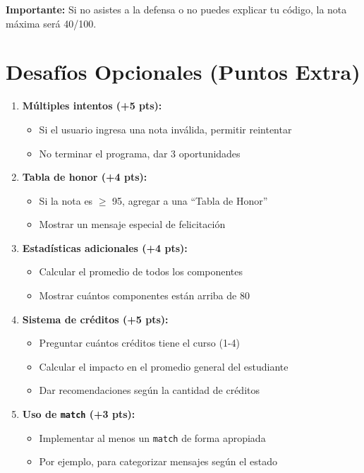 \documentclass[12pt,a4paper]{article}
\begin{document}
\textbf{Importante:} Si no asistes a la defensa o no puedes explicar tu código, la nota máxima será 40/100.

\section{Desafíos Opcionales (Puntos Extra)}

\begin{enumerate}[leftmargin=*]
    \item \textbf{Múltiples intentos (+5 pts):}
    \begin{itemize}
        \item Si el usuario ingresa una nota inválida, permitir reintentar
        \item No terminar el programa, dar 3 oportunidades
    \end{itemize}
    
    \item \textbf{Tabla de honor (+4 pts):}
    \begin{itemize}
        \item Si la nota es $\geq$ 95, agregar a una ``Tabla de Honor''
        \item Mostrar un mensaje especial de felicitación
    \end{itemize}
    
    \item \textbf{Estadísticas adicionales (+4 pts):}
    \begin{itemize}
        \item Calcular el promedio de todos los componentes
        \item Mostrar cuántos componentes están arriba de 80
    \end{itemize}
    
    \item \textbf{Sistema de créditos (+5 pts):}
    \begin{itemize}
        \item Preguntar cuántos créditos tiene el curso (1-4)
        \item Calcular el impacto en el promedio general del estudiante
        \item Dar recomendaciones según la cantidad de créditos
    \end{itemize}
    
    \item \textbf{Uso de \texttt{match} (+3 pts):}
    \begin{itemize}
        \item Implementar al menos un \texttt{match} de forma apropiada
        \item Por ejemplo, para categorizar mensajes según el estado
    \end{itemize}
\end{enumerate}
\end{document}

